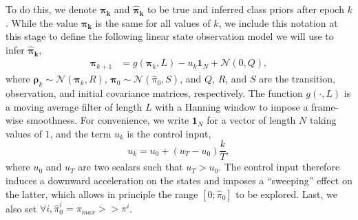 To do this, we denote $\bm{\pi_k} $ and $\bm{\hat\pi_k}$ to be true and inferred class priors after epoch $k$. While the value $\bm{\pi_k} $ is the same for all values of $k$, we include this notation at this stage to define the following linear state observation model we will use to infer $\bm{\hat\pi_k}$,
\begin{align}
\bm{\bm{\pi}}_{k+1} &= g(\bm{\pi}_{k}, L) - u_{k}\mathbf{1}_{N} + \mathcal{N}(0,Q),\label{eq:trans_fn}
\end{align}
\noindent
where $\bm{\bm{\rho}}_{k} \sim \mathcal{N}(\bm{\pi}_{k},R)$,
$\bm{\pi}_{0}  \sim \mathcal{N}(\hat\pi_{0},S)$, and $Q$, $R$, and $S$ are the transition, observation, and initial covariance matrices, respectively. The function $g(\cdot, L)$ is a moving average filter of length $L$ with a Hanning window to impose a frame-wise smoothness. For convenience, we write $\mathbf{1}_{N}$ for a vector of length $N$ taking values of $1$, and the term $u_{k}$ is the control input,
\begin{equation}
u_{k} = u_{0} + (u_{T} - u_{0})\frac{k}{T},
\end{equation}
\noindent
where $u_{0}$ and $u_{T}$ are two scalars such that $u_{T} > u_{0}$.
The control input therefore induces a downward acceleration on the states and imposes a ``sweeping'' effect on the latter, which allows in principle the range $[0; \hat \pi_{0}]$ to be explored. Last, we also set $\forall i, \hat \pi^i_0 = \pi_{max} >> \pi^{i} $.


%
%

